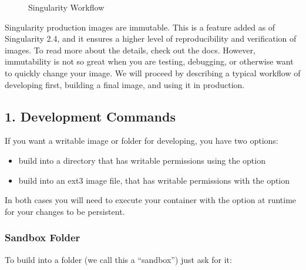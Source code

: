 \documentclass[letterpaper,10pt,english]{sphinxmanual}
\begin{document}
\begin{figure}[htbp]
\centering
\capstart

\noindent{}
\caption{Singularity Workflow}\label{\detokenize{singularity_flow:id3}}\end{figure}

Singularity production images are immutable. This is a feature added as
of Singularity 2.4, and it ensures a higher level of reproducibility and
verification of images. To read more about the details, check out the 
docs. However, immutability is not so great when you are testing,
debugging, or otherwise want to quickly change your image. We will
proceed by describing a typical workflow of developing first, building a
final image, and using it in production.


\subsection{1. Development Commands}
\label{\detokenize{singularity_flow:development-commands}}
If you want a writable image or folder for developing, you have two
options:
\begin{itemize}
\item {} 
build into a directory that has writable permissions using the  option

\item {} 
build into an ext3 image file, that has writable permissions with the 
option

\end{itemize}

In both cases you will need to execute your container with the  option at
runtime for your changes to be persistent.


\subsubsection{Sandbox Folder}
\label{\detokenize{singularity_flow:sandbox-folder}}
To build into a folder (we call this a “sandbox”) just ask for it:
\end{document}
